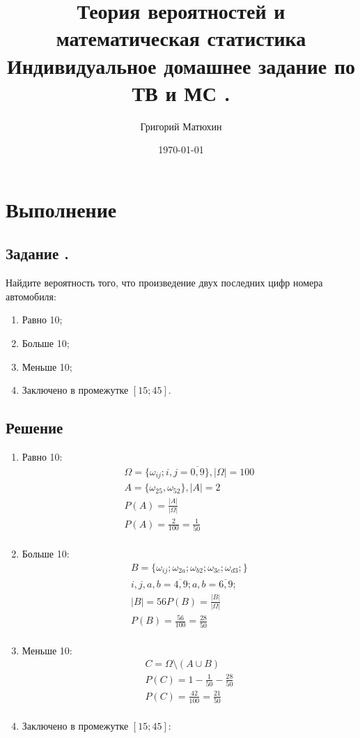 \documentclass[12pt]{article}
\author{Григорий Матюхин}
\date{\today}
\title{
	Теория вероятностей и математическая статистика \\
	\large Индивидуальное домашнее задание по ТВ и МС \textnumero1.
}
\begin{document}
\maketitle
\newpage
\tableofcontents
\newpage

\section{Выполнение}
\subsection{Задание .}
Найдите вероятность того, что произведение двух последних цифр номера автомобиля:
\begin{enumerate}
	\item Равно 10;
	\item Больше 10;
	\item Меньше 10;
	\item Заключено в промежутке $[15; 45]$.
\end{enumerate}

\subsection*{Решение}
\begin{enumerate}
	\item Равно 10: \\
	      \begin{gather*}
		      \Omega = \{\omega_{ij}; i, j = \overline{0, 9}\}, |\Omega| = 100 \\
		      A = \{\omega_{25}, \omega_{52}\}, |A| = 2 \\
		      P(A) = \frac{|A|}{|\Omega|} \\
		      P(A) = \frac{2}{100} = \frac{1}{50} \\
	      \end{gather*}
	\item Больше 10: \\
	      \begin{gather*}
		      B = \{\omega_{ij}; \omega_{2a}; \omega_{b2}; \omega_{3c}; \omega_{d3}; \} \\
		      i, j, a, b = \overline{4, 9}; a, b = \overline{6, 9}; \\
		      |B| = 56
		      P(B) = \frac{|B|}{|\Omega|} \\
		      P(B) = \frac{56}{100} = \frac{28}{50} \\
	      \end{gather*}
	\item Меньше 10:
	      \begin{gather*}
		      C = \Omega \setminus (A \cup B) \\
		      P(C) = 1 - \frac{1}{50} - \frac{28}{50} \\
		      P(C) = \frac{42}{100} = \frac{21}{50} \\
	      \end{gather*}
	\item Заключено в промежутке $[15; 45]$:
\end{enumerate}
\end{document}
